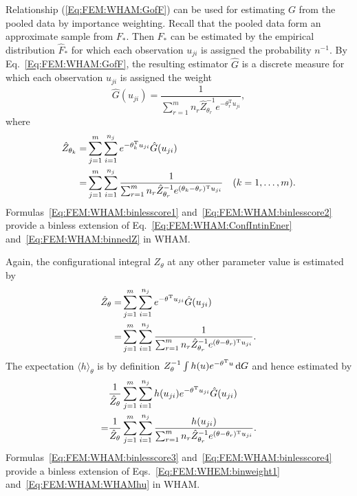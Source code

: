 Relationship (\ref{Eq:FEM:WHAM:GofF}) can be used for estimating $G$ from the pooled data by importance weighting. Recall that the pooled data form an approximate sample from $F_\ast$. Then $F_\ast$ can be estimated by the empirical distribution $\hat{F}_\ast$ for which each observation $u_{ji}$ is assigned the probability $n^{-1}$. By Eq.~\ref{Eq:FEM:WHAM:GofF}, the resulting estimator $\hat{G}$ is a discrete measure for which each observation $u_{ji}$ is assigned the weight
\begin{equation}
    \hat{G}(u_{ji})=\frac{1}{\sum_{r=1}^m n_r\hat{Z}_{\theta_r}^{-1}e^{-\theta_r^\mathrm{T}u_{ji}}},
    \label{Eq:FEM:WHAM:binlesscore1}
\end{equation}
where
\begin{align}
   \hat{Z}_{\theta_k}=&\sum_{j=1}^m \sum_{i=1}^{n_j}e^{-\theta_k^{\mathrm{T}}u_{ji}}\hat{G}(u_{ji})\notag\\
                     =&\sum_{j=1}^m \sum_{i=1}^{n_j}\frac{1}{\sum_{r=1}^m n_r\hat{Z}_{\theta_r}^{-1}e^{(\theta_k-\theta_r)^{\mathrm{T}}u_{ji}}}\quad (k=1,\dots,m).
   \label{Eq:FEM:WHAM:binlesscore2}
\end{align}
Formulas~\ref{Eq:FEM:WHAM:binlesscore1} and~\ref{Eq:FEM:WHAM:binlesscore2} provide a binless extension of Eq.~\ref{Eq:FEM:WHAM:ConfIntinEner} and~\ref{Eq:FEM:WHAM:binnedZ} in WHAM.

Again, the configurational integral $Z_\theta$ at any other parameter value is estimated by
\begin{align}
    \hat{Z}_{\theta}=&\sum_{j=1}^m \sum_{i=1}^{n_j}e^{-\theta^{\mathrm{T}}u_{ji}}\hat{G}(u_{ji})\notag\\
    =&\sum_{j=1}^m \sum_{i=1}^{n_j}\frac{1}{\sum_{r=1}^m n_r\hat{Z}_{\theta_r}^{-1}e^{(\theta-\theta_r)^{\mathrm{T}}u_{ji}}}.
    \label{Eq:FEM:WHAM:binlesscore3}
\end{align}
The expectation $\langle h\rangle_\theta$ is by definition $Z_\theta^{-1}\int h(u)e^{-\theta^\mathrm{T}u}\mathop{}\!\mathrm{d} G$ and hence estimated by
\begin{align}
    &\frac{1}{\hat{Z}_\theta}\sum_{j=1}^m\sum_{i=1}^{n_j}h(u_{ji})e^{-\theta^\mathrm{T}u_{ji}}\hat{G}(u_{ji})\notag\\
    =&\frac{1}{\hat{Z}_\theta}\sum_{j=1}^m \sum_{i=1}^{n_j}\frac{h(u_{ji})}{\sum_{r=1}^m n_r\hat{Z}_{\theta_r}^{-1}e^{(\theta-\theta_r)^{\mathrm{T}}u_{ji}}}.
    \label{Eq:FEM:WHAM:binlesscore4}
\end{align}
Formulas~\ref{Eq:FEM:WHAM:binlesscore3} and~\ref{Eq:FEM:WHAM:binlesscore4} provide a binless extension of Eqs.~\ref{Eq:FEM:WHEM:binweight1} and~\ref{Eq:FEM:WHAM:WHAMhu} in WHAM.

